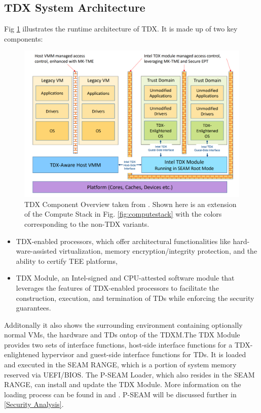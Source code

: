 \subsection{TDX System Architecture}
Fig \ref{fig:component-overview} illustrates the runtime architecture of TDX. It is made up of two key components: 
\begin{figure}
\centering
\includegraphics[width=\textwidth]{figures/TDX-Component-Overview}
\caption{TDX Component Overview taken from \cite[p.~19]{noauthor_tdx-module-10-public-specpdf_nodate}. Shown here is an extension of the Compute Stack in Fig. \ref{fig:computestack} with the colors corresponding to the non-TDX variants.}
\label{fig:component-overview}
\end{figure}
\begin{itemize}
    \item TDX-enabled processors, which offer architectural functionalities like hard-ware-assisted virtualization, memory encryption/integrity protection, and the ability to certify TEE platforms,
    \item TDX Module, an Intel-signed and CPU-attested software module that leverages the features of TDX-enabled processors to facilitate the construction, execution, and termination of TDs while enforcing the security guarantees. 
\end{itemize}
Additonally it also shows the surrounding environment containing optionally normal VMs, the hardware and TDs ontop of the TDXM.The TDX Module provides two sets of interface functions, host-side interface functions for a TDX-enlightened hypervisor and guest-side interface functions for TDs. It is loaded and executed in the SEAM RANGE, which is a portion of system memory reserved via UEFI/BIOS. The P-SEAM Loader, which also resides in the SEAM RANGE, can install and update the TDX Module. More information on the loading process can be found in \cite{noauthor_white_nodate} and \cite{noauthor_tdx-module-10-public-specpdf_nodate}. P-SEAM will be discussed further in \ref{Security Analysis}.
